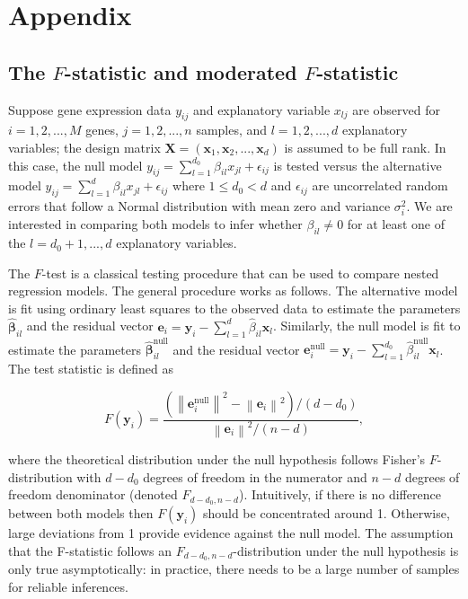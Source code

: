 \documentclass[11pt]{article}
\begin{document}
\section{Appendix\label{Sec:appendix}}

\subsection{The $F$-statistic and moderated $F$-statistic\label{Subsec:ftest}}

Suppose gene expression data $y_{ij}$ and explanatory variable $x_{lj}$ are observed for $i=1,2,...,M$ genes, $j=1,2,..., n$ samples, and $l = 1,2,...,d$ explanatory variables; the design matrix $\mathbf{X} = (\mathbf{x}_{1}, \mathbf{x}_{2}, ..., \mathbf{x}_{d})$ is assumed to be full rank. In this case, the null model $y_{ij} = \sum_{l=1}^{d_{0}} \beta_{il}x_{jl} + \epsilon_{ij}$ is tested versus the alternative model $y_{ij} = \sum_{l=1}^{d} \beta_{il}x_{jl} + \epsilon_{ij}$ where $1\leq d_{0}<d$ and $\epsilon_{ij}$ are uncorrelated random errors that follow a Normal distribution with mean zero and variance $\sigma_{i}^{2}$. We are interested in comparing both models to infer whether $\beta_{il} \neq 0$ for at least one of the $l=d_{0} + 1, ...,d$ explanatory variables.

The $F$-test is a classical testing procedure that can be used to compare nested regression models. The general procedure works as follows. The alternative model is fit using ordinary least squares to the observed data to estimate the parameters $\hat{\mathbf{\beta}}_{il}$ and the residual vector $\mathbf{e}_{i} = \mathbf{y}_{i} - \sum_{l=1}^{d} \hat{\beta}_{il} \mathbf{x}_{l}$. Similarly, the null model is fit to estimate the parameters $\hat{\mathbf{\beta}}^{\text{null}}_{il}$ and the residual vector $\mathbf{e}^{\text{null}}_{i}= \mathbf{y}_{i} - \sum_{l=1}^{d_{0}} \hat{\beta}^{\text{null}} _{il} \mathbf{x}_{l}$. The test statistic is defined as 

\begin{equation}
F(\mathbf{y}_{i}) = \dfrac{\left(\left\lVert \mathbf{e}^{\text{null}}_{i}\right\rVert ^{2} -\left\lVert \mathbf{e}_{i} \right\rVert ^ {2} \right)/(d-d_{0})}{\left\lVert \mathbf{e}_{i} \right\rVert ^ {2}/(n-d)},
\end{equation}

\noindent where the theoretical distribution under the null hypothesis follows Fisher's $F$-distribution with $d-d_{0}$ degrees of freedom in the numerator and $n-d$ degrees of freedom denominator (denoted $F_{d-d_{0}, n-d}$). Intuitively, if there is no difference between both models then $F(\mathbf{y}_{i})$ should be concentrated around 1. Otherwise, large deviations from 1 provide evidence against the null model. The assumption that the F-statistic follows an $F_{d-d_{0}, n-d}$-distribution under the null hypothesis is only true asymptotically: in practice, there needs to be a large number of samples for reliable inferences. 
\end{document}
